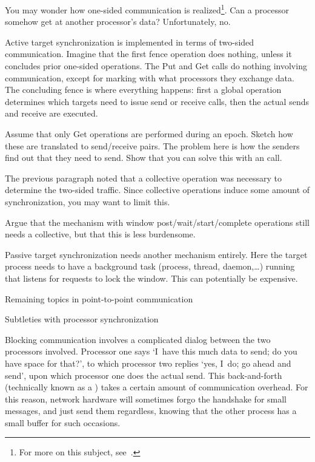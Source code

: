 You may wonder how one-sided communication is realized\footnote{For
  more on this subject, see~\cite{thakur:ijhpca-sync}.}. Can a processor
somehow get at another processor's data? Unfortunately, no.

Active target synchronization is implemented in terms of two-sided communication.
Imagine that the first fence operation does nothing, unless it concludes prior
one-sided operations. The Put and Get calls do nothing involving communication,
except for marking with what processors they exchange data.
The concluding fence is where everything happens: first a global operation
determines which targets need to issue send or receive calls, then the
actual sends and receive are executed.

\begin{exercise}
  Assume that only Get operations are performed during an epoch. 
  Sketch how these are translated to send/receive pairs. 
  The problem here is how the senders find out that they need to send.
  Show that you can solve this with an  call.
\end{exercise}

The previous paragraph noted that a collective operation was necessary
to determine the two-sided traffic. Since collective operations induce
some amount of synchronization, you may want to limit this.

\begin{exercise}
  Argue that the mechanism with window post/wait/start/complete operations
  still needs a collective, but that this is less burdensome.
\end{exercise}

Passive target synchronization needs another mechanism entirely.  Here
the target process needs to have a background task (process, thread,
daemon,\ldots) running that listens for requests to lock the
window. This can potentially be expensive.


 {Remaining topics in point-to-point communication}

 {Subtleties with processor synchronization}
\label{sec:handshake}

Blocking communication involves a complicated dialog between the two
processors involved. Processor one says `I~have this much data to
send; do you have space for that?', to which processor two replies
`yes, I~do; go ahead and send', upon which processor one does the
actual send. This back-and-forth (technically known as
a ) takes a certain amount of communication
overhead. For this reason, network hardware will sometimes forgo the
handshake for small messages, and just send them regardless, knowing
that the other process has a small buffer for such occasions.

